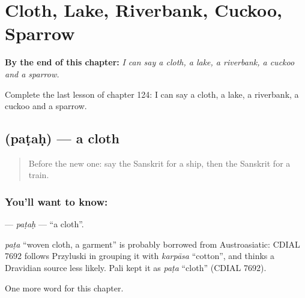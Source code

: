 
\chapter{Cloth, Lake, Riverbank, Cuckoo, Sparrow}
\label{ch:sa-cloth-lake-riverbank-cuckoo-sparrow}

\begin{chapteropening}
\textbf{By the end of this chapter:} \emph{I can say a cloth, a lake, a riverbank, a cuckoo and a sparrow.}

Complete the last lesson of chapter 124: I can say a cloth, a lake, a riverbank, a cuckoo and a sparrow.
\end{chapteropening}

\section[\texorpdfstring{\sk{पटः} (paṭaḥ)}{पटः (paṭaḥ)}]{ (paṭaḥ) — a cloth}

\label{lesson:SA-C124-patah}



\begin{quote}
Before the new one: say the Sanskrit for a ship, then the Sanskrit for a train.
\end{quote}

\subsection*{You'll want to know: }
\textbf{} — \emph{paṭaḥ} — \textquotedblleft{}a cloth\textquotedblright{}.

\begin{cousinweb}
\emph{paṭa} \textquotedblleft{}woven cloth, a garment\textquotedblright{} is probably borrowed from Austroasiatic: CDIAL 7692 follows Przyluski in grouping it with \emph{karpāsa} \textquotedblleft{}cotton\textquotedblright{}, and thinks a Dravidian source less likely. Pali kept it as \emph{paṭa} \textquotedblleft{}cloth\textquotedblright{} (CDIAL 7692).
\end{cousinweb}

\begin{grammarlens}[title={What you've built}]
One more word for this chapter.
\end{grammarlens}

